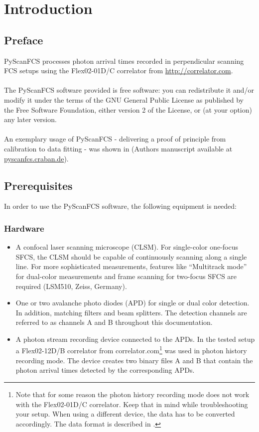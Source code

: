 
\section{Introduction}

\subsection{Preface}
PyScanFCS processes photon arrival times recorded in perpendicular scanning FCS setups using the Flex02-01D/C correlator from \url{http://correlator.com}.
\\
\\
The PyScanFCS software provided is free software: you can redistribute it and/or modify it
under the terms of the GNU General Public License as published 
by the Free Software Foundation, either version 2 of the License, 
or (at your option) any later version.
\\
\\
An exemplary usage of PyScanFCS - delivering a proof of principle from calibration to data fitting - was shown in \cite{Mueller2014} (Authors manuscript available at \url{pyscanfcs.craban.de}).

\subsection{Prerequisites}
In order to use the PyScanFCS software, the following equipment is needed:

\subsubsection*{Hardware}
\begin{itemize}
\item A confocal laser scanning microscope (CLSM). For single-color one-focus SFCS, the CLSM should be capable of continuously scanning along a single line. For more sophisticated measurements, features like ``Multitrack mode'' for dual-color measurements and frame scanning for two-focus SFCS are required (LSM510, Zeiss, Germany).

\item One or two avalanche photo diodes (APD) for single or dual color detection. In addition, matching filters and beam splitters. The detection channels are referred to as channels A and B throughout this documentation.

\item A photon stream recording device connected to the APDs. In the tested setup a Flex02-12D/B correlator from correlator.com\footnote{Note that for some reason the photon history recording mode does not work with the Flex02-01D/C correlator. Keep that in mind while troubleshooting your setup. When using a different device, the data has to be converted accordingly. The data format is described in .} was used in photon history recording mode. The device creates two binary files A and B that contain the photon arrival times detected by the corresponding APDs.
\end{itemize}

